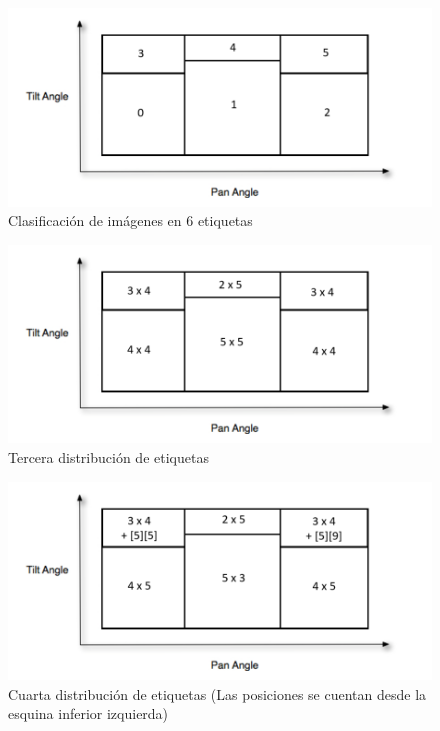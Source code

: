 \begin{figure}[H]
	\centering
	\includegraphics[scale=1]{figures/clasi1.png}
	\caption{Clasificación de imágenes en 6 etiquetas}
	\label{fig:img6}
\end{figure}

\begin{figure}[H]
	\centering
	\includegraphics[scale=1]{figures/clasi2.png}
	\caption{Tercera distribución de etiquetas}
	\label{fig:img7}
\end{figure}

\begin{figure}[H]
	\centering
	\includegraphics[scale=1]{figures/clasi3.png}
	\caption{Cuarta distribución de etiquetas (Las posiciones se cuentan desde la esquina inferior izquierda)}
	\label{fig:img8}
\end{figure}

